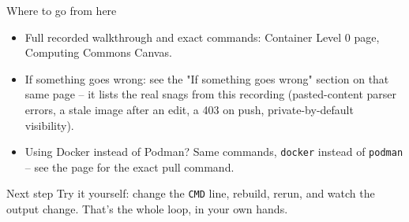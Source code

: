 \documentclass[aspectratio=169,11pt]{beamer}
\begin{document}
\begin{frame}{Where to go from here}
\begin{itemize}
  \item Full recorded walkthrough and exact commands: Container Level 0
    page, Computing Commons Canvas.
  \item If something goes wrong: see the "If something goes wrong" section
    on that same page -- it lists the real snags from this recording
    (pasted-content parser errors, a stale image after an edit, a
    403 on push, private-by-default visibility).
  \item Using Docker instead of Podman? Same commands, \texttt{docker}
    instead of \texttt{podman} -- see the page for the exact pull command.
\end{itemize}
\vspace{0.4cm}
\begin{exampleblock}{Next step}
Try it yourself: change the \texttt{CMD} line, rebuild, rerun, and watch
the output change. That's the whole loop, in your own hands.
\end{exampleblock}
\end{frame}
\end{document}
